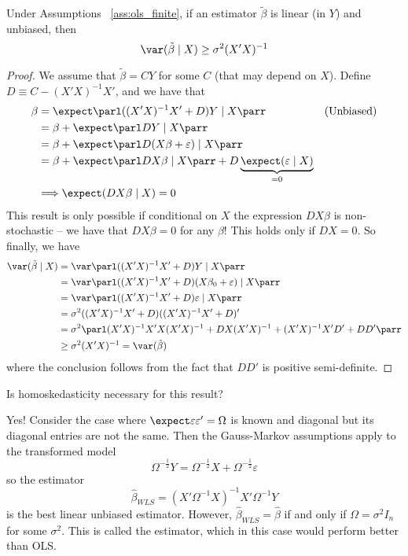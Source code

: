 \documentclass[10pt]{article}
\begin{document}
\begin{theorem}
	 Under Assumptions	~\ref{ass:ols_finite}, if an estimator $\tilde{\beta}$ is linear (in $Y$) and unbiased, then \[\var(\tilde{\beta} \mid X) \ge \sigma^2 (X'X)^{-1}\]
\end{theorem}
\begin{proof}
	We assume that $\tilde{\beta} = CY$ for some $C$ (that may depend on $X$). Define $D \equiv C - (X'X)^{-1}X'$, and we have that
	\begin{align*}
		\beta &= \expect\parl ((X'X)^{-1}X' + D)Y \mid X\parr &&(\text{Unbiased}) \\ 
		&= \beta + \expect\parl DY \mid X\parr \\
		&= \beta + \expect \parl D(X\beta + \varepsilon) \mid X\parr \\
		&= \beta + \expect\parl DX\beta \mid X\parr + D\underbrace{\expect(\varepsilon \mid X)}_{=0} \\&\Longrightarrow\expect(DX\beta \mid X) = 0
	\end{align*}
	This result is only possible if conditional on $X$ the expression $DX\beta$ is non-stochastic -- we have that $DX\beta = 0$ for any $\beta$! This holds only if $DX = 0$. So finally, we have
	\begin{align*}
		\var(\tilde{\beta} \mid X) &= \var\parl ((X'X)^{-1}X' + D)Y \mid X\parr \\
		&= \var\parl ((X'X)^{-1}X' + D)(X\beta_0 + \varepsilon) \mid X\parr \\
		&= \var\parl ((X'X)^{-1}X' + D) \varepsilon \mid X\parr \\
		&= \sigma^2 ((X'X)^{-1}X' + D)((X'X)^{-1}X' + D)' \\
		&= \sigma^2 \parl (X'X)^{-1}X'X (X'X)^{-1} + DX(X'X)^{-1} + (X'X)^{-1}X'D' + DD'\parr \\
		&\ge \sigma^2 (X'X)^{-1} = \var(\hat{\beta})
	\end{align*}
	where the conclusion follows from the fact that $DD'$ is positive semi-definite.
\end{proof}


\begin{question}
	Is homoskedasticity necessary for this result? 
\end{question}
\begin{answer}
	Yes! Consider the case where $\expect \varepsilon\varepsilon' = \Omega$ is known and diagonal but its diagonal entries are not the same. Then the Gauss-Markov assumptions apply to the transformed model \[\Omega^{-\frac{1}{2}}Y = \Omega^{-\frac{1}{2}}X +  \Omega^{-\frac{1}{2}}\varepsilon\] so the estimator \[\hat{\beta}_{WLS} = (X'\Omega^{-1}X)^{-1}X' \Omega^{-1}Y\]is the best linear unbiased estimator. However, $\hat{\beta}_{WLS} = \hat{\beta}$ if and only if $\Omega = \sigma^2 I_n$ for some $\sigma^2$. This is called the  estimator, which in this case would perform better than OLS.
\end{answer}
\end{document}

